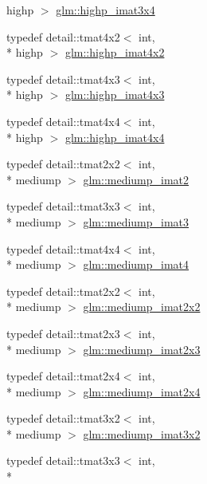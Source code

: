 \begin{DoxyCompactItemize}
highp $>$ \hyperlink{group__gtc__matrix__integer_ga97ddf84f7ae0c5d4d3ecc18bb1d47449}{glm\-::highp\-\_\-imat3x4}
\item 
typedef detail\-::tmat4x2$<$ int, \\*
highp $>$ \hyperlink{group__gtc__matrix__integer_gad998dce143f674a95a25241ff6e5e7d2}{glm\-::highp\-\_\-imat4x2}
\item 
typedef detail\-::tmat4x3$<$ int, \\*
highp $>$ \hyperlink{group__gtc__matrix__integer_ga9d51b6f1c8cd0b23c6fcc8dca924b14c}{glm\-::highp\-\_\-imat4x3}
\item 
typedef detail\-::tmat4x4$<$ int, \\*
highp $>$ \hyperlink{group__gtc__matrix__integer_ga969c88d5c7530beb80768205a054ee80}{glm\-::highp\-\_\-imat4x4}
\item 
typedef detail\-::tmat2x2$<$ int, \\*
mediump $>$ \hyperlink{group__gtc__matrix__integer_gaec03a8eef2ec2536f8bebffd0bac8192}{glm\-::mediump\-\_\-imat2}
\item 
typedef detail\-::tmat3x3$<$ int, \\*
mediump $>$ \hyperlink{group__gtc__matrix__integer_ga6b438ab863af0122b532adc93b89105e}{glm\-::mediump\-\_\-imat3}
\item 
typedef detail\-::tmat4x4$<$ int, \\*
mediump $>$ \hyperlink{group__gtc__matrix__integer_gabf1a0fd4c85a21f67535b737e1feb355}{glm\-::mediump\-\_\-imat4}
\item 
typedef detail\-::tmat2x2$<$ int, \\*
mediump $>$ \hyperlink{group__gtc__matrix__integer_ga472222f6e3754124ee9cb64acaaedac1}{glm\-::mediump\-\_\-imat2x2}
\item 
typedef detail\-::tmat2x3$<$ int, \\*
mediump $>$ \hyperlink{group__gtc__matrix__integer_gabc92c714c2d257213c5b0771669df177}{glm\-::mediump\-\_\-imat2x3}
\item 
typedef detail\-::tmat2x4$<$ int, \\*
mediump $>$ \hyperlink{group__gtc__matrix__integer_ga90b020de8489a1d4424c0ffcc17c83dd}{glm\-::mediump\-\_\-imat2x4}
\item 
typedef detail\-::tmat3x2$<$ int, \\*
mediump $>$ \hyperlink{group__gtc__matrix__integer_ga2a90775c74656b8a825f24d510f0ea5d}{glm\-::mediump\-\_\-imat3x2}
\item 
typedef detail\-::tmat3x3$<$ int, \\*

\end{DoxyCompactItemize}

